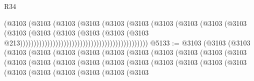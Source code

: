 \begin{lexlean}{R34}
\begin{coremodule}
                                                                  (@3103
                                                                    (@3103
                                                                      (@3103
                                                                        (@3103
                                                                          (@3103
                                                                            (@3103
                                                                              (@3103
                                                                                (@3103
                                                                                  (@3103
                                                                                    (@3103
                                                                                      (@3103
                                                                                        (@3103
                                                                                          (@3103
                                                                                            (@3103
                                                                                              (@3103
                                                                                                (@3103
                                                                                                  @213)))))))))))))))))))))))))))))))))))))))))))))))
@5133 := @3103
    (@3103
      (@3103
        (@3103
          (@3103
            (@3103
              (@3103
                (@3103
                  (@3103
                    (@3103
                      (@3103
                        (@3103
                          (@3103
                            (@3103
                              (@3103
                                (@3103
                                  (@3103
                                    (@3103
                                      (@3103
                                        (@3103
                                          (@3103
                                            (@3103
                                              (@3103
                                                (@3103
                                                  (@3103
                                                    (@3103
                                                      (@3103
                                                        (@3103
                                                          (@3103

\end{coremodule}
\end{lexlean}
